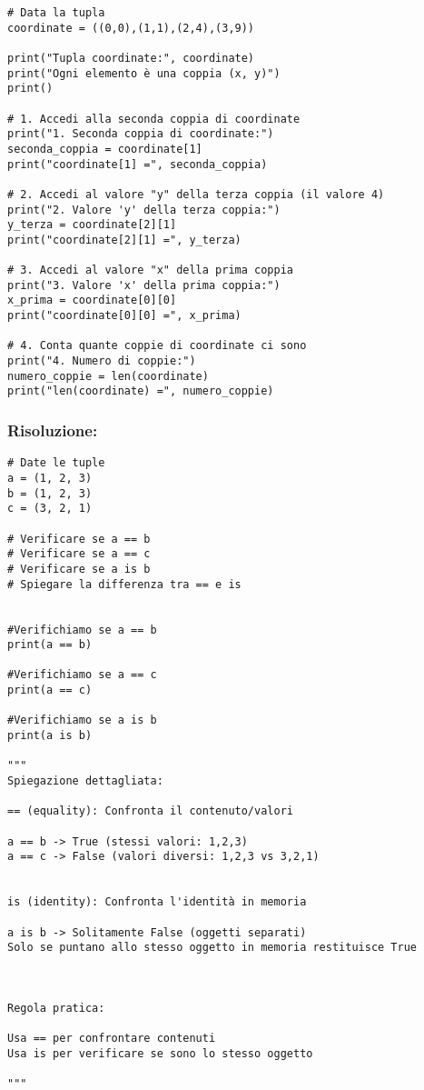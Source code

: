 \begin{lstlisting}
# Data la tupla
coordinate = ((0,0),(1,1),(2,4),(3,9))

print("Tupla coordinate:", coordinate)
print("Ogni elemento è una coppia (x, y)")
print()

# 1. Accedi alla seconda coppia di coordinate
print("1. Seconda coppia di coordinate:")
seconda_coppia = coordinate[1]
print("coordinate[1] =", seconda_coppia)

# 2. Accedi al valore "y" della terza coppia (il valore 4)
print("2. Valore 'y' della terza coppia:")
y_terza = coordinate[2][1]
print("coordinate[2][1] =", y_terza)

# 3. Accedi al valore "x" della prima coppia  
print("3. Valore 'x' della prima coppia:")
x_prima = coordinate[0][0]
print("coordinate[0][0] =", x_prima)

# 4. Conta quante coppie di coordinate ci sono
print("4. Numero di coppie:")
numero_coppie = len(coordinate)
print("len(coordinate) =", numero_coppie)

\end{lstlisting}


\subsubsection{Risoluzione: }

\begin{lstlisting}
# Date le tuple
a = (1, 2, 3)
b = (1, 2, 3)
c = (3, 2, 1)

# Verificare se a == b
# Verificare se a == c
# Verificare se a is b
# Spiegare la differenza tra == e is


#Verifichiamo se a == b
print(a == b)

#Verifichiamo se a == c
print(a == c)

#Verifichiamo se a is b
print(a is b)

"""
Spiegazione dettagliata:

== (equality): Confronta il contenuto/valori

a == b -> True (stessi valori: 1,2,3)
a == c -> False (valori diversi: 1,2,3 vs 3,2,1)


is (identity): Confronta l'identità in memoria

a is b -> Solitamente False (oggetti separati)
Solo se puntano allo stesso oggetto in memoria restituisce True



Regola pratica:

Usa == per confrontare contenuti
Usa is per verificare se sono lo stesso oggetto

"""

\end{lstlisting}

